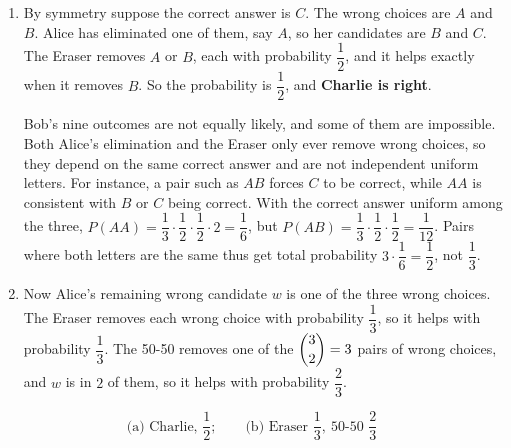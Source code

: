 \begin{enumerate}
\item By symmetry suppose the correct answer is $C$. The wrong choices are $A$ and $B$. Alice has eliminated one of them, say $A$, so her candidates are $B$ and $C$. The Eraser removes $A$ or $B$, each with probability $\dfrac{1}{2}$, and it helps exactly when it removes $B$. So the probability is $\dfrac{1}{2}$, and \textbf{Charlie is right}.

Bob's nine outcomes are not equally likely, and some of them are impossible. Both Alice's elimination and the Eraser only ever remove wrong choices, so they depend on the same correct answer and are not independent uniform letters. For instance, a pair such as $AB$ forces $C$ to be correct, while $AA$ is consistent with $B$ or $C$ being correct. With the correct answer uniform among the three, $P(AA)=\dfrac{1}{3}\cdot\dfrac{1}{2}\cdot\dfrac{1}{2}\cdot 2=\dfrac{1}{6}$, but $P(AB)=\dfrac{1}{3}\cdot\dfrac{1}{2}\cdot\dfrac{1}{2}=\dfrac{1}{12}$. Pairs where both letters are the same thus get total probability $3\cdot\dfrac{1}{6}=\dfrac{1}{2}$, not $\dfrac{1}{3}$.
\item Now Alice's remaining wrong candidate $w$ is one of the three wrong choices. The Eraser removes each wrong choice with probability $\dfrac{1}{3}$, so it helps with probability $\dfrac{1}{3}$. The 50-50 removes one of the $\dbinom32=3$ pairs of wrong choices, and $w$ is in $2$ of them, so it helps with probability $\dfrac{2}{3}$.
\end{enumerate}
\[\boxed{\text{(a) Charlie, } \dfrac{1}{2};\qquad \text{(b) Eraser } \dfrac{1}{3},\ \text{50-50 } \dfrac{2}{3}}\]
